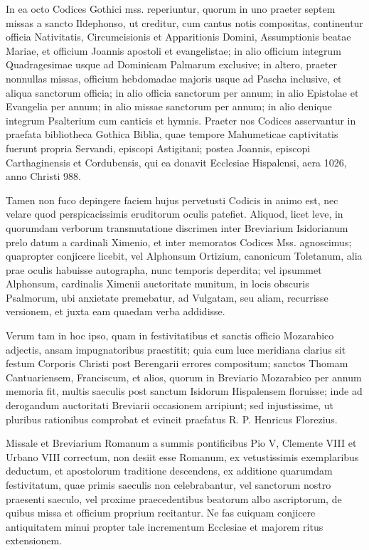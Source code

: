 \documentclass[letter,11pt]{book}
\begin{document}
In ea octo Codices Gothici mss. reperiuntur, quorum in uno praeter septem missas a sancto Ildephonso, ut creditur, cum cantus notis compositas, continentur officia Nativitatis, Circumcisionis et Apparitionis Domini, Assumptionis beatae Mariae, et officium Joannis apostoli et evangelistae; in alio officium integrum Quadragesimae usque ad Dominicam Palmarum exclusive; in altero, praeter nonnullas missas, officium hebdomadae majoris usque ad Pascha inclusive, et aliqua sanctorum officia; in alio officia sanctorum per annum; in alio Epistolae et Evangelia per annum; in alio missae sanctorum per annum; in alio denique integrum Psalterium cum canticis et hymnis. Praeter nos Codices asservantur in praefata bibliotheca Gothica Biblia, quae tempore Mahumeticae captivitatis fuerunt propria Servandi, episcopi Astigitani; postea Joannis, episcopi Carthaginensis et Cordubensis, qui ea donavit Ecclesiae Hispalensi, aera 1026, anno Christi 988.

Tamen non fuco depingere faciem hujus pervetusti Codicis in animo est, nec velare quod perspicacissimis eruditorum oculis patefiet. Aliquod, licet leve, in quorumdam verborum transmutatione discrimen inter Breviarium Isidorianum prelo datum a cardinali Ximenio, et inter memoratos Codices Mss. agnoscimus; quapropter conjicere licebit, vel Alphonsum Ortizium, canonicum Toletanum, alia prae oculis habuisse autographa, nunc temporis deperdita; vel ipsummet Alphonsum, cardinalis Ximenii auctoritate munitum, in locis obscuris Psalmorum, ubi anxietate premebatur, ad Vulgatam, seu aliam, recurrisse versionem, et juxta eam quaedam verba addidisse.

Verum tam in hoc ipso, quam in festivitatibus et sanctis officio Mozarabico adjectis, ansam impugnatoribus praestitit; quia cum luce meridiana clarius sit festum Corporis Christi post Berengarii errores compositum; sanctos Thomam Cantuariensem, Franciscum, et alios, quorum in Breviario Mozarabico per annum memoria fit, multis saeculis post sanctum Isidorum Hispalensem floruisse; inde ad derogandum auctoritati Breviarii occasionem arripiunt; sed injustissime, ut pluribus rationibus comprobat et evincit praefatus R. P. Henricus Florezius.

Missale et Breviarium Romanum a summis pontificibus Pio V, Clemente VIII et Urbano VIII correctum, non desiit esse Romanum, ex vetustissimis exemplaribus deductum, et apostolorum traditione descendens, ex additione quarumdam festivitatum, quae primis saeculis non celebrabantur, vel sanctorum nostro praesenti saeculo, vel proxime praecedentibus beatorum albo ascriptorum, de quibus missa et officium proprium recitantur. Ne fas cuiquam conjicere antiquitatem minui propter tale incrementum Ecclesiae et majorem ritus extensionem.
\end{document}

